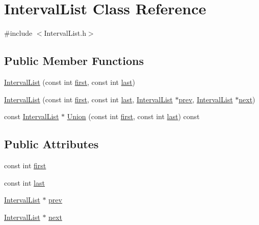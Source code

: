 \hypertarget{class_interval_list}{\section{Interval\-List Class Reference}
\label{class_interval_list}
}


{\ttfamily \#include $<$Interval\-List.\-h$>$}

\subsection*{Public Member Functions}
\begin{DoxyCompactItemize}
\item 
\hyperlink{class_interval_list_a2dac81ac5a0130ec43c0b69113e527f1}{Interval\-List} (const int \hyperlink{class_interval_list_ae0cdf99da88c06a7d684964e2330eade}{first}, const int \hyperlink{class_interval_list_aa93f98ec04c2960f0f573ad44437a92b}{last})
\item 
\hyperlink{class_interval_list_a65e463f699bcbd826dd54db3f6990f45}{Interval\-List} (const int \hyperlink{class_interval_list_ae0cdf99da88c06a7d684964e2330eade}{first}, const int \hyperlink{class_interval_list_aa93f98ec04c2960f0f573ad44437a92b}{last}, \hyperlink{class_interval_list}{Interval\-List} $\ast$\hyperlink{class_interval_list_a65f0ce062c99c24b5890550f3c0fcbd5}{prev}, \hyperlink{class_interval_list}{Interval\-List} $\ast$\hyperlink{class_interval_list_ae97a594b41b0e48efb55d1377fc84126}{next})
\item 
const \hyperlink{class_interval_list}{Interval\-List} $\ast$ \hyperlink{class_interval_list_a83795fbff6ac102cfd69e2705a455d9c}{Union} (const int \hyperlink{class_interval_list_ae0cdf99da88c06a7d684964e2330eade}{first}, const int \hyperlink{class_interval_list_aa93f98ec04c2960f0f573ad44437a92b}{last}) const 
\end{DoxyCompactItemize}
\subsection*{Public Attributes}
\begin{DoxyCompactItemize}
\item 
const int \hyperlink{class_interval_list_ae0cdf99da88c06a7d684964e2330eade}{first}
\item 
const int \hyperlink{class_interval_list_aa93f98ec04c2960f0f573ad44437a92b}{last}
\item 
\hyperlink{class_interval_list}{Interval\-List} $\ast$ \hyperlink{class_interval_list_a65f0ce062c99c24b5890550f3c0fcbd5}{prev}
\item 
\hyperlink{class_interval_list}{Interval\-List} $\ast$ \hyperlink{class_interval_list_ae97a594b41b0e48efb55d1377fc84126}{next}
\end{DoxyCompactItemize}


